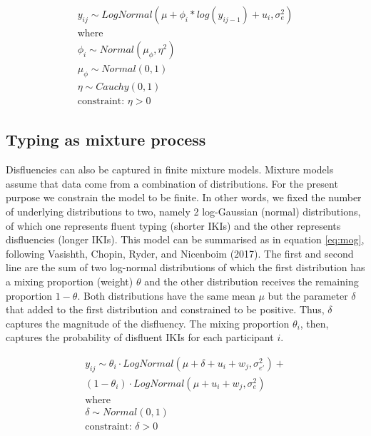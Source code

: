 \documentclass[english,man,floatsintext]{apa7}
\begin{document}
\[
\tag{6}
\begin{aligned}
y_{ij} \sim LogNormal(\mu + \phi_i*log(y_{ij-1}) + u_i, \sigma_e^2)\\
\text{where}\\
\phi_i \sim Normal(\mu_{\phi}, \eta^2)\\
\mu_{\phi} \sim Normal(0, 1)\\
\eta \sim Cauchy(0, 1)\\
\text{constraint: }\eta >0 
\end{aligned}
\label{eq:ark}
\]

\hypertarget{typing-as-mixture-process}{%
\subsection{Typing as mixture process}\label{typing-as-mixture-process}}

Disfluencies can also be captured in finite mixture models. Mixture models assume that data come from a combination of distributions. For the present purpose we constrain the model to be finite. In other words, we fixed the number of underlying distributions to two, namely 2 log-Gaussian (normal) distributions, of which one represents fluent typing (shorter IKIs) and the other represents disfluencies (longer IKIs). This model can be summarised as in equation \ref{eq:mog}, following Vasishth, Chopin, Ryder, and Nicenboim (2017). The first and second line are the sum of two log-normal distributions of which the first distribution has a mixing proportion (weight) \(\theta\) and the other distribution receives the remaining proportion \(1-\theta\). Both distributions have the same mean \(\mu\) but the parameter \(\delta\) that added to the first distribution and constrained to be positive. Thus, \(\delta\) captures the magnitude of the disfluency. The mixing proportion \(\theta_i\), then, captures the probability of disfluent IKIs for each participant \(i\).

\[
\tag{7}
\begin{aligned}
    y_{ij} \sim \theta_i \cdot LogNormal(\mu + \delta + u_i + w_j, \sigma_{e'}^2) +\\
        (1 - \theta_i) \cdot LogNormal(\mu + u_i + w_j, \sigma_{e}^2)\\
        \text{where}\\
        \delta \sim Normal(0,1)\\
        \text{constraint: } \delta > 0
\end{aligned}   
\label{eq:mog}
\]
\end{document}
